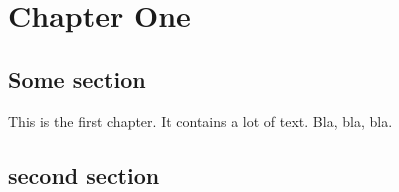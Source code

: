 \chapter{Chapter One}

\section{Some section}
This is the first chapter. It contains a lot of text.
Bla, bla, bla. 

\section{second section}